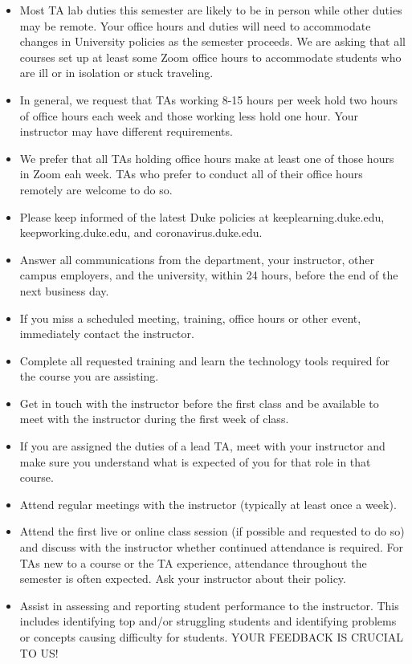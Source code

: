 \documentclass[
]{article}
\begin{document}
\begin{itemize}
\item
  Most TA lab duties this semester are likely to be in person while other duties may be remote. Your office hours and duties will need to accommodate changes in University policies as the semester proceeds. We are asking that all courses set up at least some Zoom office hours to accommodate students who are ill or in isolation or stuck traveling.
\item
  In general, we request that TAs working 8-15 hours per week hold two hours of office hours each week and those working less hold one hour. Your instructor may have different requirements.
\item
  We prefer that all TAs holding office hours make at least one of those hours in Zoom eah week. TAs who prefer to conduct all of their office hours remotely are welcome to do so.
\item
  Please keep informed of the latest Duke policies at keeplearning.duke.edu, keepworking.duke.edu, and coronavirus.duke.edu.
\item
  Answer all communications from the department, your instructor, other campus employers, and the university, within 24 hours, before the end of the next business day.
\item
  If you miss a scheduled meeting, training, office hours or other event, immediately contact the instructor.
\item
  Complete all requested training and learn the technology tools required for the course you are assisting.
\item
  Get in touch with the instructor before the first class and be available to meet with the instructor during the first week of class.
\item
  If you are assigned the duties of a lead TA, meet with your instructor and make sure you understand what is expected of you for that role in that course.
\item
  Attend regular meetings with the instructor (typically at least once a week).
\item
  Attend the first live or online class session (if possible and requested to do so) and discuss with the instructor whether continued attendance is required. For TAs new to a course or the TA experience, attendance throughout the semester is often expected. Ask your instructor about their policy.
\item
  Assist in assessing and reporting student performance to the instructor. This includes identifying top and/or struggling students and identifying problems or concepts causing difficulty for students. YOUR FEEDBACK IS CRUCIAL TO US!

\end{itemize}
\end{document}
